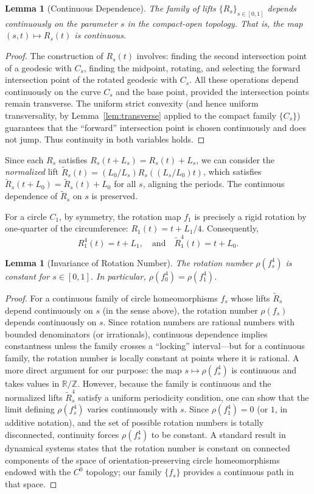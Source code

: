\documentclass{article}
\newtheorem{lemma}[theorem]{Lemma}
\begin{document}
\begin{lemma}[Continuous Dependence]\label{lem:continuous}
    The family of lifts $\{R_s\}_{s\in[0,1]}$ depends continuously on the parameter $s$ in the compact-open topology. That is, the map $(s,t) \mapsto R_s(t)$ is continuous.
\end{lemma}
\begin{proof}
    The construction of $R_s(t)$ involves: finding the second intersection point of a geodesic with $C_s$, finding the midpoint, rotating, and selecting the forward intersection point of the rotated geodesic with $C_s$. All these operations depend continuously on the curve $C_s$ and the base point, provided the intersection points remain transverse. The uniform strict convexity (and hence uniform transversality, by Lemma~\ref{lem:transverse} applied to the compact family $\{C_s\}$) guarantees that the “forward” intersection point is chosen continuously and does not jump. Thus continuity in both variables holds.
\end{proof}
Since each $R_s$ satisfies $R_s(t+L_s) = R_s(t) + L_s$, we can consider the \emph{normalized} lift $\tilde{R}_s(t) = (L_0/L_s) R_s((L_s/L_0)t)$, which satisfies $\tilde{R}_s(t+L_0) = \tilde{R}_s(t) + L_0$ for all $s$, aligning the periods. The continuous dependence of $\tilde{R}_s$ on $s$ is preserved.

For a circle $C_1$, by symmetry, the rotation map $f_1$ is precisely a rigid rotation by one-quarter of the circumference: $R_1(t) = t + L_1/4$. Consequently,
\[
R_1^4(t) = t + L_1, \quad \text{and} \quad \tilde{R}_1^4(t) = t + L_0.
\]

\begin{lemma}[Invariance of Rotation Number]\label{lem:rotationinvariance}
    The rotation number $\rho(f_s^4)$ is constant for $s \in [0,1]$. In particular, $\rho(f_0^4) = \rho(f_1^4)$.
\end{lemma}
\begin{proof}
    For a continuous family of circle homeomorphisms $f_s$ whose lifts $\tilde{R}_s$ depend continuously on $s$ (in the sense above), the rotation number $\rho(f_s)$ depends continuously on $s$. Since rotation numbers are rational numbers with bounded denominators (or irrationals), continuous dependence implies constantness unless the family crosses a “locking” interval—but for a continuous family, the rotation number is locally constant at points where it is rational. A more direct argument for our purpose: the map $s \mapsto \rho(f_s^4)$ is continuous and takes values in $\mathbb{R}/\mathbb{Z}$. However, because the family is continuous and the normalized lifts $\tilde{R}_s^4$ satisfy a uniform periodicity condition, one can show that the limit defining $\rho(f_s^4)$ varies continuously with $s$. Since $\rho(f_1^4) = 0$ (or $1$, in additive notation), and the set of possible rotation numbers is totally disconnected, continuity forces $\rho(f_s^4)$ to be constant. A standard result in dynamical systems states that the rotation number is constant on connected components of the space of orientation-preserving circle homeomorphisms endowed with the $C^0$ topology; our family $\{f_s\}$ provides a continuous path in that space.
\end{proof}
\end{document}

